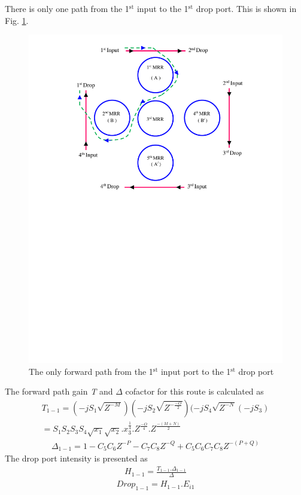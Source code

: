 \documentclass{osa-article}
\begin{document}
There is only one path from the 1$^{\text{st}}$ input to the 1$^{\text{st}}$ drop port. This is shown in Fig. \ref{fig2a_ID11}.\\
  \begin{figure}[tb]
\centering
\includegraphics[width=3 in]{figs/fig2a_ID11.pdf}
	\caption{The only forward path from the 1$^{\text{st}}$ input port to the 1$^{\text{st}}$ drop port}
	\label{fig2a_ID11}
\end{figure} 
The forward path gain \textit {T} and $\Delta$ cofactor for this route is calculated as\\
\begin{equation}
\begin{split}
T_{1-1}=(-jS_{1}\sqrt{Z^{-M}})(-jS_{2}\sqrt{Z^{-\frac{-O}{2}}})(-jS_{4}\sqrt{Z^{-N}}(-jS_3)\\
=S_1S_2S_3S_4\sqrt{x_1}\sqrt{x_2}.{x^{\frac{1}{4}}_3}.Z^{\frac{-O}{4}}.Z^{\frac{-(M+N)}{2}}
\label{eqa47}
\end{split}
\end{equation}
\begin{equation}
\begin{split}
\Delta_{1-1}=1-C_5C_6Z^{-P}-C_7C_8Z^{-Q}+C_5C_6C_7C_8Z^{-(P+Q)}
\label{eqa48}
\end{split}
\end{equation}
The drop port intensity is presented as\\
\begin{equation}
\begin{split}
H_{1-1}=\frac{T_{1-1}.\Delta_{1-1}}{\Delta}
\label{eqa49}
\end{split}
\end{equation}
\begin{equation}
\begin{split}
Drop_{1-1}=H_{1-1}.E_{i1}
\label{eqa50}
\end{split}
\end{equation}
\end{document}

